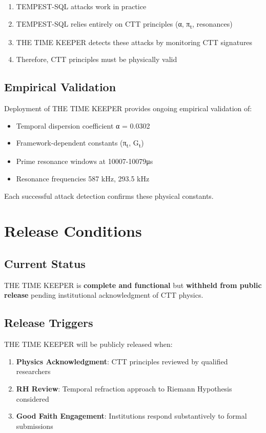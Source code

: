 \documentclass[11pt,a4paper]{article}
\begin{document}
\begin{enumerate}
    \item TEMPEST-SQL attacks work in practice
    \item TEMPEST-SQL relies entirely on CTT principles (α, π\textsubscript{t}, resonances)
    \item THE TIME KEEPER detects these attacks by monitoring CTT signatures
    \item Therefore, CTT principles must be physically valid
\end{enumerate}

\subsection{Empirical Validation}

Deployment of THE TIME KEEPER provides ongoing empirical validation of:

\begin{itemize}
    \item Temporal dispersion coefficient α = 0.0302
    \item Framework-dependent constants (π\textsubscript{t}, G\textsubscript{t})
    \item Prime resonance windows at 10007-10079μs
    \item Resonance frequencies 587 kHz, 293.5 kHz
\end{itemize}

Each successful attack detection confirms these physical constants.

\section{Release Conditions}

\subsection{Current Status}

THE TIME KEEPER is \textbf{complete and functional} but \textbf{withheld from public release} pending institutional acknowledgment of CTT physics.

\subsection{Release Triggers}

THE TIME KEEPER will be publicly released when:

\begin{enumerate}
    \item \textbf{Physics Acknowledgment}: CTT principles reviewed by qualified researchers
    \item \textbf{RH Review}: Temporal refraction approach to Riemann Hypothesis considered
    \item \textbf{Good Faith Engagement}: Institutions respond substantively to formal submissions
\end{enumerate}
\end{document}
